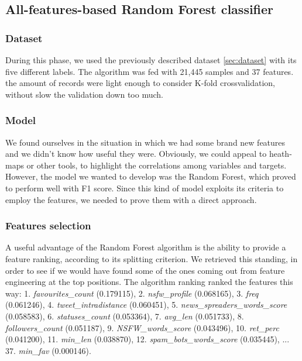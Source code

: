 \subsection{All-features-based Random Forest classifier}
\subsubsection{Dataset}
During this phase, we used the previously described dataset \ref{sec:dataset} with its five different labels.
The algorithm was fed with 21,445 samples and 37 features. the amount of records were light enough to consider K-fold crossvalidation, without slow the validation down too much.
\subsubsection{Model}
We found ourselves in the situation in which we had some brand new features and we didn't know how useful they were. Obviously, we could appeal to heath-maps or other tools, to highlight the correlations among variables and targets.
However, the model we wanted to develop was the Random Forest, which proved to perform well with F1 score. Since this kind of model exploits its criteria to employ the features, we needed to prove them with a direct approach.

\subsubsection{Features selection}
A useful advantage of the Random Forest algorithm is the ability to provide a feature ranking, according to its splitting criterion.
We retrieved this standing, in order to see if we would have found some of the ones coming out from feature engineering at the top positions.
The algorithm ranking ranked the features this way: 1. \textit{favourites\_count} (0.179115), 2. \textit{nsfw\_profile} (0.068165), 3. \textit{freq} (0.061246), 4. \textit{tweet\_intradistance} (0.060451), 5. \textit{news\_spreaders\_words\_score} (0.058583), 6. \textit{statuses\_count} (0.053364), 7. \textit{avg\_len} (0.051733), 8. \textit{followers\_count} (0.051187), 9. \textit{NSFW\_words\_score} (0.043496), 10. \textit{ret\_perc} (0.041200), 11. \textit{min\_len} (0.038870), 12. \textit{spam\_bots\_words\_score} (0.035445), ...  37. \textit{min\_fav} (0.000146).

